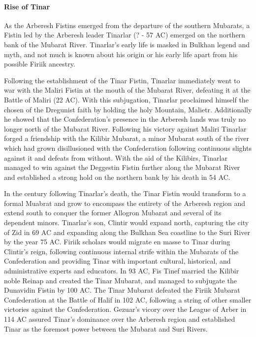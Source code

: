 		\paragraph{Rise of Tinar}
			As the Arberesh Fistins emerged from the departure of the southern Mubarats, a Fistin led by the Arberesh leader Tinarlar (? - 57 AC) emerged on the northern bank of the Mubarat River. Tinarlar's early life is masked in Bulkhan legend and myth, and not much is known about his origin or his early life apart from his possible Firiik ancestry. 
			
			Following the establishment of the Tinar Fistin, Tinarlar immediately went to war with the Maliri Fistin at the mouth of the Mubarat River, defeating it at the Battle of Maliri (22 AC). With this subjugation, Tinarlar proclaimed himself the chosen of the Dregunist faith by holding the holy Mountain, Malietr. Additionally he showed that the Confederation's presence in the Arberesh lands was truly no longer north of the Mubarat River. Following his victory against Maliri Tinarlar forged a friendship with the Kilibir Mubarat, a minor Mubarat south of the river which had grown disillusioned with the Confederation following continuous slights against it and defeats from without. With the aid of the Kilibirs, Tinarlar managed to win against the Deggestin Fistin further along the Mubarat River and established a strong hold on the northern bank by his death in 54 AC.
			
			In the century following Tinarlar's death, the Tinar Fistin would transform to a formal Muabrat and grow to encompass the entirety of the Arberesh region and extend south to conquer the former Allogron Mubarat and several of its dependent minors. Tinarlar's son, Clintir would expand north, capturing the city of Zid in 69 AC and expanding along the Bulkhan Sea coastline to the Suri River by the year 75 AC. Firiik scholars would migrate en masse to Tinar during Clintir's reign, following continuous internal strife within the Mubarats of the Confederation and providing Tinar with important cultural, historical, and administrative experts and educators. In 93 AC, Fis Tinef married the Kilibir noble Reinap and created the Tinar Mubarat, and managed to subjugate the Dunavidin Fistin by 100 AC. The Tinar Mubarat defeated the Firiik Mubarat Confederation at the Battle of Halif in 102 AC, following a string of other smaller victories against the Confederation. Gezuar's vicory over the League of Arber in 114 AC assured Tinar's dominance over the Arberesh region and established Tinar as the foremost power between the Mubarat and Suri Rivers.
			
